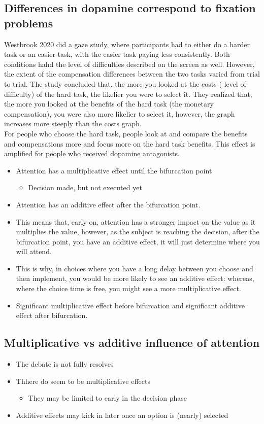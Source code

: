 \subsection{Differences in dopamine correspond to fixation  problems}
Westbrook 2020 did a gaze study, where participants had to either do a harder task or an easier task, with the easier task paying less consistently. Both conditions hahd the level of difficulties described on the screen as well. However, the extent of the compensation differences between the two tasks varied from trial to trial. The study concluded that, the more you looked at the costs ( level of difficulty) of the hard task, the likelier you were to select it. They realized that, the more you looked at the benefits of the hard task (the monetary compensation), you were also more likelier to select it, however, the graph increases more steeply than the costs graph.
\\For people who choose the hard task, people look at and compare the benefits and compensations more and focus more on the hard task benefits. This effect is amplified for people who received dopamine antagonists.
\begin{itemize}
    \item Attention has a multiplicative effect until the bifurcation point
    \begin{itemize}
        \item Decision made, but not executed yet
    \end{itemize}
    \item Attention has an additive effect after the bifurcation point.
    \item This means that, early on, attention has a stronger impact on the value as it multiplies the value, however, as the subject is reaching the decision, after the bifurcation point, you have an additive effect, it will just determine where you will attend.
    \item This is why, in choices where you have a long delay between you choose and then implement, you would be more likely to see an additive effect: whereas, where the choice time is free, you might see a more multiplicative effect.
    \item Significant multiplicative effect before bifurcation and significant additive effect after bifurcation.
\end{itemize}
\subsection{Multiplicative vs additive influence of attention}
\begin{itemize}
    \item The debate is not fully resolves
    \item Thhere do seem to be multiplicative effects
    \begin{itemize}
        \item They may be limited to early in the decision phase
    \end{itemize}
    \item Additive effects may kick in later once an option is (nearly) selected
\end{itemize}

